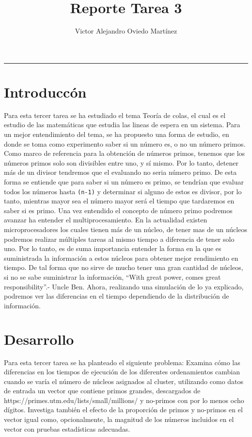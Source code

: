 \documentclass{article}
\title{Reporte Tarea 3}
\author{Victor Alejandro Oviedo Martínez}
\begin{document}
\maketitle
\hrule

\section{Introduccón}\label{intro}

Para esta tercer tarea\citep{DRA.P3} se ha estudiado el tema Teoría de colas, el cual es el estudio de las matemáticas que estudia las lineas de espera en un sistema. Para un mejor entendimiento del tema, se ha propuesto una forma de estudio, en donde se toma como experimento saber si un número es, o no un número primos. Como marco de referencia para la obtención de números primos, tenemos que los números primos solo son divisibles entre uno, y sí mismo. Por lo tanto, detener más de un divisor tendremos que el evaluando no seria número primo.  De esta forma se entiende que para saber si un número es primo, se tendrían que evaluar todos los números hasta  \texttt{(n-1)} y determinar si alguno de estos es divisor, por lo tanto, mientras mayor sea el número mayor será el tiempo que tardaremos en saber si es primo.  Una vez entendido el concepto de número primo podremos avanzar ha entender el multiprocesamiento. En la actualidad existen microprocesadores los cuales tienen más de un núcleo,  de tener mas de un núcleos podremos realizar múltiples tareas al mismo tiempo a diferencia de tener solo uno. Por lo tanto, es de suma importancia entender la forma en la que es suministrada la información a estos núcleos para obtener mejor rendimiento en tiempo. De tal forma que no sirve de mucho tener una gran cantidad de núcleos, si no se sabe suministrar la información, ``With great power, comes great responsibility''.- Uncle Ben. Ahora, realizando una simulación de lo ya explicado, podremos ver las diferencias en el tiempo dependiendo  de la distribución de  información.   \\


\section{Desarrollo}

Para esta tercer tarea se ha planteado el siguiente problema: Examina cómo las diferencias en los tiempos de ejecución de los diferentes ordenamientos cambian cuando se varía el número de núcleos asignados al cluster, utilizando como datos de entrada un vector que contiene primos grandes, descargados de https://primes.utm.edu/lists/small/millions/ y no-primos con por lo menos ocho dígitos. Investiga también el efecto de la proporción de primos y no-primos en el vector igual como, opcionalmente, la magnitud de los números incluidos en el vector con pruebas estadísticas adecuadas.\\
\end{document}
